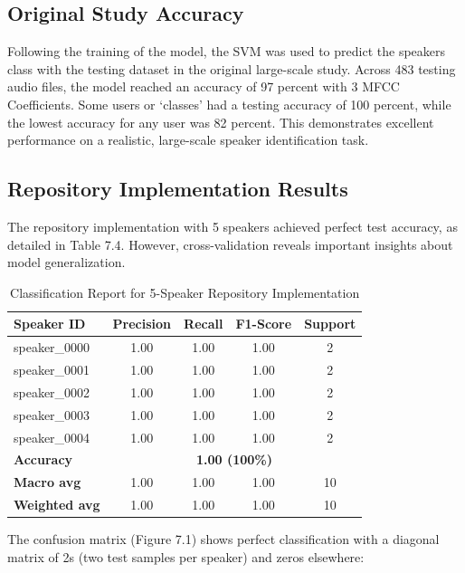 \documentclass[11pt,twoside,openany]{book}
\begin{document}
\subsection{Original Study Accuracy}
Following the training of the model, the SVM was used to predict the speakers class with the testing dataset in the original large-scale study. Across 483 testing audio files, the model reached an accuracy of 97 percent with 3 MFCC Coefficients. Some users or `classes' had a testing accuracy of 100 percent, while the lowest accuracy for any user was 82 percent. This demonstrates excellent performance on a realistic, large-scale speaker identification task.

\subsection{Repository Implementation Results}
The repository implementation with 5 speakers achieved perfect test accuracy, as detailed in Table 7.4. However, cross-validation reveals important insights about model generalization.

\begin{table}[h!]
    \centering
    \begin{tabular}{|l|c|c|c|c|}
        \hline
        \textbf{Speaker ID} & \textbf{Precision} & \textbf{Recall} & \textbf{F1-Score} & \textbf{Support}\\ \hline
         speaker\_0000  & 1.00 & 1.00 & 1.00 & 2\\ \hline
         speaker\_0001 & 1.00 & 1.00 & 1.00 & 2\\ \hline
         speaker\_0002 & 1.00 & 1.00 & 1.00 & 2\\ \hline
         speaker\_0003 & 1.00 & 1.00 & 1.00 & 2\\ \hline
         speaker\_0004 & 1.00 & 1.00 & 1.00 & 2\\ \hline
         \hline
         \textbf{Accuracy} & \multicolumn{4}{c|}{\textbf{1.00 (100\%)}}\\ \hline
         \textbf{Macro avg} & 1.00 & 1.00 & 1.00 & 10\\ \hline
         \textbf{Weighted avg} & 1.00 & 1.00 & 1.00 & 10\\ \hline
    \end{tabular}
    \caption{Classification Report for 5-Speaker Repository Implementation}
    \label{tab:5speaker_classification}
\end{table}

The confusion matrix (Figure 7.1) shows perfect classification with a diagonal matrix of 2s (two test samples per speaker) and zeros elsewhere:
\end{document}
